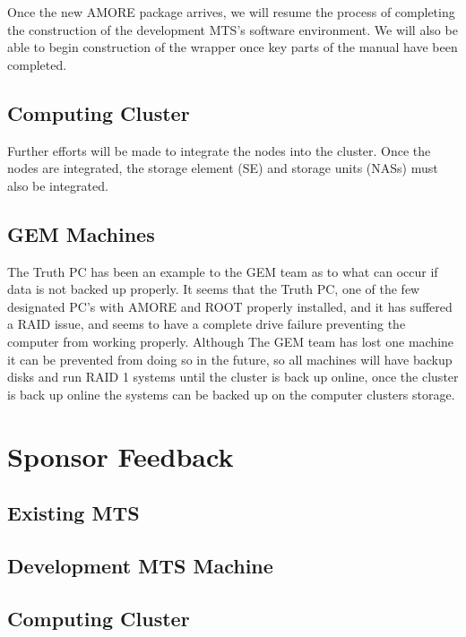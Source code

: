 \documentclass[12pt]{article}
\newcommand\tab[1][1cm]{\hspace*{#1}}
\begin{document}
\tab Once the new AMORE package arrives, we will resume the process of
completing the construction of the development MTS's software environment. We
will also be able to begin construction of the wrapper once key parts of the
manual have been completed.

\subsection{Computing Cluster}

\tab Further efforts will be made to integrate the nodes into the cluster. Once
the nodes are integrated, the storage element (SE) and storage units (NASs) must
also be integrated.

\subsection{GEM Machines}

\tab The Truth PC has been an example to the GEM team as to what can occur if
data is not backed up properly. It seems that the Truth PC, one of the few designated PC's with AMORE and ROOT properly installed, and it has suffered a
RAID issue, and seems to have a complete drive failure preventing the computer
from working properly. Although The GEM team has lost one machine it can be 
prevented from doing so in the future, so all machines will have backup disks
and run RAID 1 systems until the cluster is back up online, once the cluster is
back up online the systems can be backed up on the computer clusters storage. 

\section{Sponsor Feedback}

\subsection{Existing MTS}

\vspace{1in}

\subsection{Development MTS Machine}

\vspace{1in}

\subsection{Computing Cluster}
\end{document}
